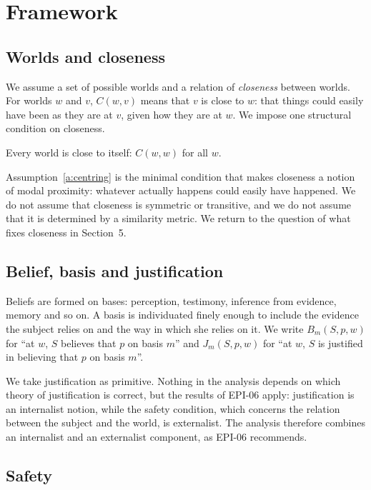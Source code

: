 \documentclass{situationist-preprint}
\begin{document}
\section{Framework}

\subsection{Worlds and closeness}

We assume a set of possible worlds and a relation of \emph{closeness} between worlds. For worlds $w$ and $v$, $C(w,v)$ means that $v$ is close to $w$: that things could easily have been as they are at $v$, given how they are at $w$. We impose one structural condition on closeness.

\begin{assumption}[Centring]\label{a:centring}
Every world is close to itself: $C(w,w)$ for all $w$.
\end{assumption}

Assumption~\ref{a:centring} is the minimal condition that makes closeness a notion of modal proximity: whatever actually happens could easily have happened. We do not assume that closeness is symmetric or transitive, and we do not assume that it is determined by a similarity metric. We return to the question of what fixes closeness in Section~5.

\subsection{Belief, basis and justification}

Beliefs are formed on bases: perception, testimony, inference from evidence, memory and so on. A basis is individuated finely enough to include the evidence the subject relies on and the way in which she relies on it. We write $B_m(S, p, w)$ for \enquote{at $w$, $S$ believes that $p$ on basis $m$} and $J_m(S,p,w)$ for \enquote{at $w$, $S$ is justified in believing that $p$ on basis $m$}.

We take justification as primitive. Nothing in the analysis depends on which theory of justification is correct, but the results of EPI-06 apply: justification is an internalist notion, while the safety condition, which concerns the relation between the subject and the world, is externalist. The analysis therefore combines an internalist and an externalist component, as EPI-06 recommends.

\subsection{Safety}
\end{document}
